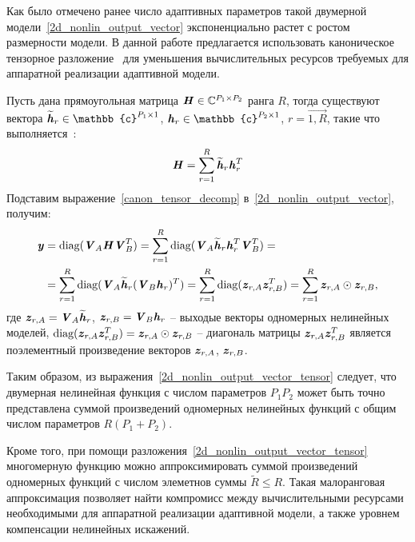 Как было отмечено ранее число адаптивных параметров такой двумерной модели~\eqref{2d_nonlin_output_vector} экспоненциально растет с ростом размерности модели. В данной работе предлагается использовать каноническое тензорное разложение~\cite{matrix_calc} для уменьшения вычислительных ресурсов требуемых для аппаратной реализации адаптивной модели. 

Пусть дана прямоугольная матрица $\textbf{\textit{H}}\in\mathbb{C}^{P_1\times P_2}$ ранга $R$, тогда существуют вектора $\widetilde{\bit{h}}_r\in\mathbb{c}^{P_1\times1}$, $\bit{h}_r\in\mathbb{c}^{P_2\times1}$, $r=\overrightarrow{1, R}$, такие что выполняется~\cite{matrix_calc}:
\begin{equation}
	\textbf{\textit{H}}=\sum_{r=1}^{R}\widetilde{\textbf{\textit{h}}}_r\textbf{\textit{h}}_r^T
	\label{canon_tensor_decomp}
\end{equation} 
Подставим выражение~\eqref{canon_tensor_decomp} в~\eqref{2d_nonlin_output_vector}, получим:
\begin{align}
	\textbf{\textit{y}}&=\text{diag}(\textbf{\textit{V}}_A\textbf{\textit{H}}\textbf{\textit{V}}_B^T)=\sum_{r=1}^{R}\text{diag}(\textbf{\textit{V}}_A\widetilde{\textbf{\textit{h}}}_r\textbf{\textit{h}}_r^T\textbf{\textit{V}}_B^T)= \nonumber \\
	&=\sum_{r=1}^{R}\text{diag}(\textbf{\textit{V}}_A\widetilde{\textbf{\textit{h}}}_r(\textbf{\textit{V}}_B\textbf{\textit{h}}_r)^T)=
	\sum_{r=1}^{R}\text{diag}(\textbf{\textit{z}}_{r, A}\textbf{\textit{z}}_{r, B}^T)=\sum_{r=1}^{R}\textbf{\textit{z}}_{r, A}\odot\textbf{\textit{z}}_{r, B},
	\label{2d_nonlin_output_vector_tensor}
\end{align} 
где $\textbf{\textit{z}}_{r, A}=\textbf{\textit{V}}_A\widetilde{\textbf{\textit{h}}}_r$, $\textbf{\textit{z}}_{r, B}=\textbf{\textit{V}}_B\textbf{\textit{h}}_r$ -- выходые векторы одномерных нелинейных моделей, $\text{diag}(\textbf{\textit{z}}_{r, A}\textbf{\textit{z}}_{r, B}^T)=\textbf{\textit{z}}_{r, A}\odot\textbf{\textit{z}}_{r, B}$ -- диагональ матрицы $\textbf{\textit{z}}_{r, A}\textbf{\textit{z}}_{r, B}^T$ является поэлементный произведение векторов $\textbf{\textit{z}}_{r, A}$, $\textbf{\textit{z}}_{r, B}$.

Таким образом, из выражения~\eqref{2d_nonlin_output_vector_tensor} следует, что двумерная нелинейная функция с числом параметров $P_1P_2$ может быть точно представлена суммой произведений одномерных нелинейных функций с общим числом параметров $R(P_1+P_2)$. 

Кроме того, при помощи разложения~\eqref{2d_nonlin_output_vector_tensor} многомерную функцию можно аппроксимировать суммой произведений одномерных функций с числом элеметнов суммы $\widetilde{R}\leqslant R$. Такая малоранговая аппроксимация позволяет найти компромисс между вычислительными ресурсами необходимыми для аппаратной реализации адаптивной модели, а также уровнем компенсации нелинейных искажений.

